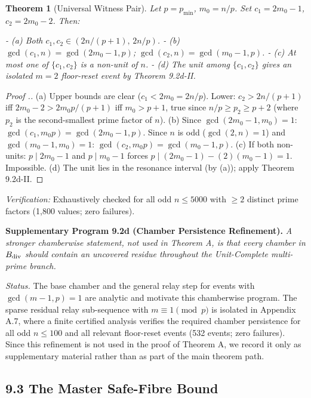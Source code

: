 \documentclass[11pt,a4paper]{article}
\theoremstyle{plain}
\newtheorem{theorem}{Theorem}[section]
\theoremstyle{definition}
\theoremstyle{remark}
\begin{document}
\begin{theorem}[Universal Witness Pair]
Let $p = p_{\min}$, $m_0 = n/p$. Set $c_1 = 2m_0-1$, $c_2 = 2m_0-2$. Then:

- \textit{(a) Both $c_1, c_2 \in (2n/(p+1),\, 2n/p)$.}
- \textit{(b) $\gcd(c_1, n) = \gcd(2m_0-1, p)$; $\gcd(c_2, n) = \gcd(m_0-1, p)$.}
- \textit{(c) At most one of $\{c_1, c_2\}$ is a non-unit of $n$.}
- \textit{(d) The unit among $\{c_1, c_2\}$ gives an isolated $m=2$ floor-reset event by Theorem 9.2d-II.}

\end{theorem}

\begin{proof}[Proof .]
(a) Upper bounds are clear ($c_1 < 2m_0 = 2n/p$). Lower: $c_2 > 2n/(p+1)$ iff $2m_0-2 > 2m_0 p/(p+1)$ iff $m_0 > p+1$, true since $n/p \geq p_2 \geq p+2$ (where $p_2$ is the second-smallest prime factor of $n$). (b) Since $\gcd(2m_0-1, m_0) = 1$: $\gcd(c_1, m_0 p) = \gcd(2m_0-1, p)$. Since $n$ is odd ($\gcd(2,n)=1$) and $\gcd(m_0-1, m_0) = 1$: $\gcd(c_2, m_0 p) = \gcd(m_0-1, p)$. (c) If both non-units: $p \mid 2m_0-1$ and $p \mid m_0-1$ forces $p \mid (2m_0-1)-(2)(m_0-1) = 1$. Impossible. (d) The unit lies in the resonance interval (by (a)); apply Theorem 9.2d-II.
\end{proof}

\textit{Verification:} Exhaustively checked for all odd $n \leq 5000$ with $\geq 2$ distinct prime factors (1,800 values; zero failures).


\medskip


\textbf{Supplementary Program 9.2d (Chamber Persistence Refinement).} \textit{A stronger chamberwise statement, not used in Theorem A, is that every chamber in $B_{\rm div}$ should contain an uncovered residue throughout the Unit-Complete multi-prime branch.}

\textit{Status.} The base chamber and the general relay step for events with $\gcd(m-1,p)=1$ are analytic and motivate this chamberwise program. The sparse residual relay sub-sequence with $m \equiv 1 \pmod p$ is isolated in Appendix A.7, where a finite certified analysis verifies the required chamber persistence for all odd $n \leq 100$ and all relevant floor-reset events (532 events; zero failures). Since this refinement is not used in the proof of Theorem A, we record it only as supplementary material rather than as part of the main theorem path.


\subsection{9.3 The Master Safe-Fibre Bound}
\end{document}
